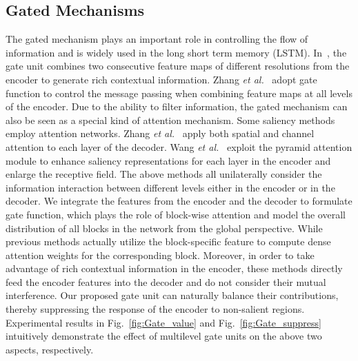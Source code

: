 \documentclass[runningheads]{llncs}
\begin{document}
	\subsection{Gated Mechanisms}
	The gated mechanism plays an important role in controlling the flow of information and is widely used in the long short term memory (LSTM). 
In~\cite{gatedlabel}, the gate unit combines two consecutive feature maps of different resolutions from the encoder to generate rich contextual information. Zhang \textit{et al.}~\cite{BMPM} adopt gate function to control the message passing when combining feature maps at all levels of the encoder. 
Due to the ability to filter information, the gated mechanism can also be seen as a special kind of attention mechanism.
	Some saliency methods~\cite{RAS,PAGRN,PASE} employ attention networks. Zhang \textit{et al.}~\cite{PAGRN} apply both spatial and channel attention to each layer of the decoder. Wang \textit{et al.}~\cite{PASE} exploit the pyramid attention module to enhance saliency representations for each layer in the encoder and enlarge the receptive field. 
The above methods all unilaterally consider the information interaction between different levels either in the encoder or in the decoder. We integrate the features from the encoder and the decoder to formulate gate function, which plays the role of block-wise attention and model the overall distribution of all blocks in the network from the global perspective. While previous methods actually utilize the block-specific feature to compute dense attention weights for the corresponding block.
Moreover, in order to take advantage of rich contextual information in the encoder, these methods directly feed the encoder features into the decoder and do not consider their mutual interference. Our proposed gate unit can naturally balance their contributions, thereby suppressing the response of the encoder to non-salient regions. 
Experimental results in Fig.~\ref{fig:Gate_value} and Fig.~\ref{fig:Gate_suppress} intuitively demonstrate the effect of multilevel gate units on the above two aspects, respectively.
	
\end{document}
